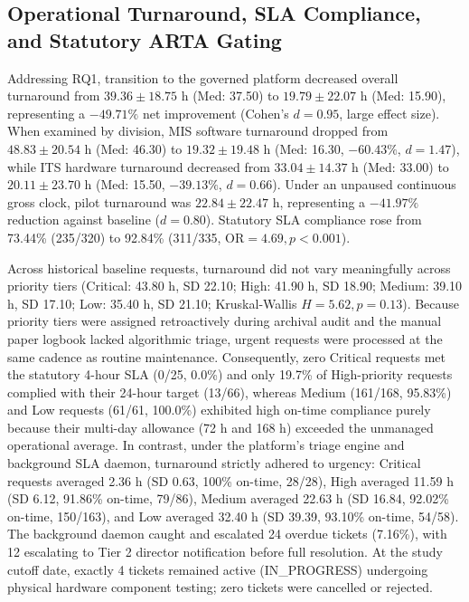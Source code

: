 \documentclass[conference]{IEEEtran}
\begin{document}
\subsection{Operational Turnaround, SLA Compliance, and Statutory ARTA Gating}
Addressing RQ1, transition to the governed platform decreased overall turnaround from $39.36 \pm 18.75\text{ h}$ (Med: 37.50) to $19.79 \pm 22.07\text{ h}$ (Med: 15.90), representing a $-49.71\%$ net improvement (Cohen's $d = 0.95$, large effect size). When examined by division, MIS software turnaround dropped from $48.83 \pm 20.54\text{ h}$ (Med: 46.30) to $19.32 \pm 19.48\text{ h}$ (Med: 16.30, $-60.43\%$, $d = 1.47$), while ITS hardware turnaround decreased from $33.04 \pm 14.37\text{ h}$ (Med: 33.00) to $20.11 \pm 23.70\text{ h}$ (Med: 15.50, $-39.13\%$, $d = 0.66$). Under an unpaused continuous gross clock, pilot turnaround was $22.84 \pm 22.47\text{ h}$, representing a $-41.97\%$ reduction against baseline ($d = 0.80$). Statutory SLA compliance rose from 73.44\% (235/320) to 92.84\% (311/335, $\text{OR} = 4.69, p < 0.001$).

Across historical baseline requests, turnaround did not vary meaningfully across priority tiers (Critical: 43.80 h, SD 22.10; High: 41.90 h, SD 18.90; Medium: 39.10 h, SD 17.10; Low: 35.40 h, SD 21.10; Kruskal-Wallis $H = 5.62, p = 0.13$). Because priority tiers were assigned retroactively during archival audit and the manual paper logbook lacked algorithmic triage, urgent requests were processed at the same cadence as routine maintenance. Consequently, zero Critical requests met the statutory 4-hour SLA (0/25, 0.0\%) and only 19.7\% of High-priority requests complied with their 24-hour target (13/66), whereas Medium (161/168, 95.83\%) and Low requests (61/61, 100.0\%) exhibited high on-time compliance purely because their multi-day allowance (72 h and 168 h) exceeded the unmanaged operational average. In contrast, under the platform's triage engine and background SLA daemon, turnaround strictly adhered to urgency: Critical requests averaged 2.36 h (SD 0.63, 100\% on-time, 28/28), High averaged 11.59 h (SD 6.12, 91.86\% on-time, 79/86), Medium averaged 22.63 h (SD 16.84, 92.02\% on-time, 150/163), and Low averaged 32.40 h (SD 39.39, 93.10\% on-time, 54/58). The background daemon caught and escalated 24 overdue tickets (7.16\%), with 12 escalating to Tier 2 director notification before full resolution. At the study cutoff date, exactly 4 tickets remained active (IN\_PROGRESS) undergoing physical hardware component testing; zero tickets were cancelled or rejected.
\end{document}
